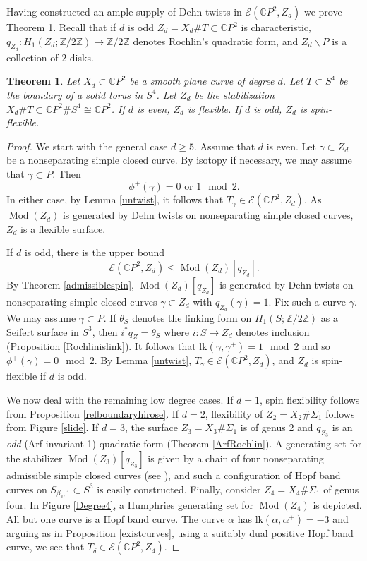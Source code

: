 \documentclass[10pt]{amsart}
\numberwithin{equation}{section}
\theoremstyle{plain}
\newtheorem{maintheorem}{Theorem}
\theoremstyle{definition}
\theoremstyle{remark}
\DeclareMathOperator{\Mod}{Mod}
\begin{document}
Having constructed an ample supply of Dehn twists in $\mathcal{E}(\mathbb{C}P^2,Z_d)$ we prove Theorem \ref{ThmB}. Recall that if $d$ is odd $Z_d = X_d \# T \subset \mathbb{C}P^2$ is characteristic, $q_{Z_d} : H_1(Z_d;\mathbb{Z}/2\mathbb{Z}) \to \mathbb{Z}/2\mathbb{Z}$ denotes Rochlin's quadratic form, and $Z_d\backslash P$ is a collection of 2-disks. 

\begin{maintheorem} \label{ThmB}
Let $X_d \subset \mathbb{C}P^2$ be a smooth plane curve of degree $d$.  Let $T \subset S^4$ be the boundary of a solid torus in $S^4$. Let $Z_d$ be the stabilization $X_d \# T \subset \mathbb{C}P^2 \# S^4 \cong \mathbb{C}P^2$. If $d$ is even, $Z_d$ is flexible. If $d$ is odd,  $Z_d$ is spin-flexible. 
\end{maintheorem}


\begin{proof}
We start with the general case $d \geq 5$. Assume that $d$ is even. Let $\gamma \subset Z_d$ be a nonseparating simple closed curve. By isotopy if necessary, we may assume that $\gamma \subset P$. Then \[\phi^+(\gamma) = 0 \textrm{ or } 1 \mod 2.\] In either case, by Lemma \ref{untwist}, it follows that $T_{\gamma} \in \mathcal{E}(\mathbb{C}P^2,Z_d)$. As $\Mod(Z_d)$ is generated by Dehn twists on nonseparating simple closed curves,  $Z_d$ is a flexible surface.


If $d$ is odd, there is the upper bound \[\mathcal{E}(\mathbb{C}P^2,Z_d) \leq \Mod(Z_d)[q_{Z_d}].\] By Theorem \ref{admissiblespin}, $\Mod(Z_d)[q_{Z_d}]$ is generated by Dehn twists on nonseparating simple closed curves $\gamma \subset Z_d$ with $q_{Z_d}(\gamma) = 1$. Fix such a curve $\gamma$. We may assume $\gamma \subset P$. If $\theta_{S}$ denotes the linking form on $H_1(S;\mathbb{Z}/2\mathbb{Z})$ as a Seifert surface in $S^3$, then $i^*q_{Z} = \theta_S$ where $i : S \to Z_d$ denotes inclusion (Proposition \ref{Rochlinislink}).  It follows that $\mathrm{lk}(\gamma,\gamma^+) = 1 \mod 2$ and so $\phi^+(\gamma) = 0 \mod 2$. By Lemma \ref{untwist}, $T_{\gamma}\in \mathcal{E}(\mathbb{C}P^2,Z_d)$, and $Z_d$ is spin-flexible if $d$ is odd.

We now deal with the remaining low degree cases. If $d = 1$, spin flexibility follows from Proposition \ref{relboundaryhirose}. If $d = 2$, flexibility of $Z_2= X_2 \# \Sigma_1$ follows from Figure \ref{slide}. If $d = 3$, the surface $Z_3 = X_3 \# \Sigma_1$ is of genus 2 and $q_{Z_3}$ is an \textit{odd} (Arf invariant 1) quadratic form (Theorem \ref{ArfRochlin}). A generating set for the stabilizer $\Mod(Z_3)[q_{Z_3}]$ is given by a chain of four nonseparating admissible simple closed curves (see \cite[Lemma 4.4]{Hamenstadt}), and such a configuration of Hopf band curves on $S_{\beta_3,1} \subset S^3$ is easily constructed. Finally, consider $Z_4 = X_4 \# \Sigma_1$ of genus four. In Figure \ref{Degree4}, a Humphries generating set for $\Mod(Z_4)$ is depicted. All but one curve is a Hopf band curve. The curve $\alpha$ has $\mathrm{lk}(\alpha,\alpha^+) = -3$ and arguing as in Proposition \ref{existcurves}, using a suitably dual positive Hopf band curve, we see that $T_{\delta} \in \mathcal{E}(\mathbb{C}P^2,Z_4)$.  
\end{proof}
\end{document}
